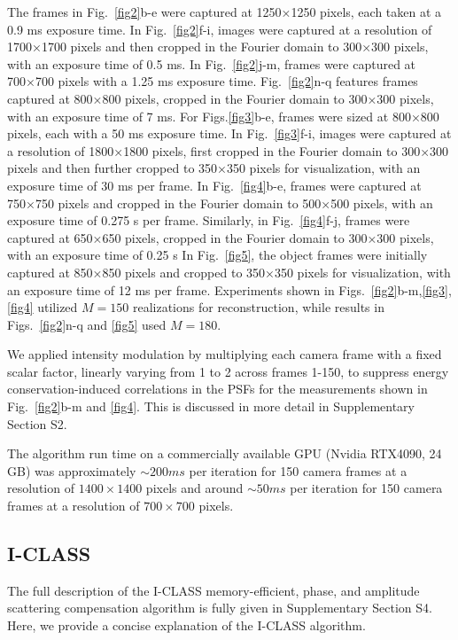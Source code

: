 \documentclass[pdflatex,sn-mathphys-num]{sn-jnl}%
\theoremstyle{thmstyleone}%
\theoremstyle{thmstyletwo}%
\theoremstyle{thmstylethree}%
\begin{document}
The frames in Fig.~\ref{fig2}b-e were captured at 1250×1250 pixels, each taken at a 0.9 ms exposure time. In Fig.~\ref{fig2}f-i, images were captured at a resolution of 1700×1700 pixels and then cropped in the Fourier domain to 300×300 pixels, with an exposure time of 0.5 ms. In Fig.~\ref{fig2}j-m, frames were captured at 700×700 pixels with a 1.25 ms exposure time. Fig.~\ref{fig2}n-q features frames captured at 800×800 pixels, cropped in the Fourier domain to 300×300 pixels, with an exposure time of 7 ms.
For Figs.\ref{fig3}b-e, frames were sized at 800×800 pixels, each with a 50 ms exposure time. In Fig.~\ref{fig3}f-i, images were captured at a resolution of 1800×1800 pixels, first cropped in the Fourier domain to 300×300 pixels and then further cropped to 350×350 pixels for visualization, with an exposure time of 30 ms per frame.
In Fig.~\ref{fig4}b-e, frames were captured at 750×750 pixels and cropped in the Fourier domain to 500×500 pixels, with an exposure time of 0.275 s per frame. Similarly, in Fig.~\ref{fig4}f-j, frames were captured at 650×650 pixels, cropped in the Fourier domain to 300×300 pixels, with an exposure time of 0.25 s
In Fig.~\ref{fig5}, the object frames were initially captured at 850×850 pixels and cropped to 350×350 pixels for visualization, with an exposure time of 12 ms per frame.
Experiments shown in Figs.~\ref{fig2}b-m,\ref{fig3},\ref{fig4} utilized $M=150$ realizations for reconstruction, while results in Figs.~\ref{fig2}n-q 
and \ref{fig5} used $M=180$.

We applied intensity modulation by multiplying each camera frame with a fixed scalar factor, linearly varying from 1 to 2 across frames 1-150, to suppress energy conservation-induced correlations in the PSFs for the measurements shown in Fig.~\ref{fig2}b-m and \ref{fig4}. This is discussed in more detail in Supplementary Section S2.

The algorithm run time on a commercially available GPU (Nvidia RTX4090, 24 GB) was approximately $\sim 200ms$ per iteration for 150 camera frames at a resolution of $1400 \times 1400$ pixels and around $\sim 50ms$ per iteration for 150 camera frames at a resolution of $700 \times 700$ pixels.


\subsection*{I-CLASS}
The full description of the I-CLASS memory-efficient, phase, and amplitude scattering compensation algorithm is fully given in Supplementary Section S4. Here, we provide a concise explanation of the I-CLASS algorithm.
\end{document}
